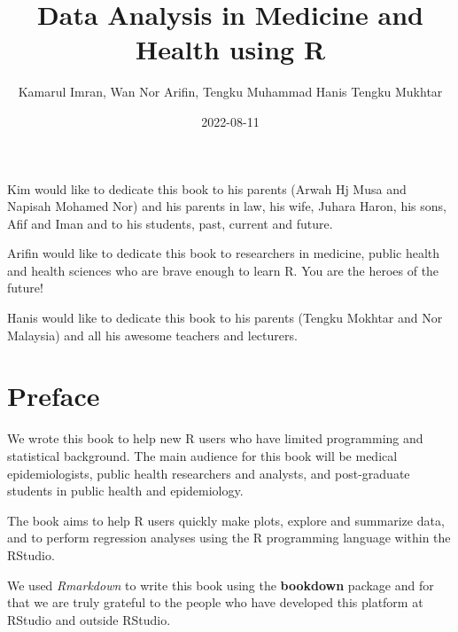 \documentclass[
  10pt,
]{krantz}
\title{Data Analysis in Medicine and Health using R}
\author{Kamarul Imran, Wan Nor Arifin, Tengku Muhammad Hanis Tengku Mukhtar}
\date{2022-08-11}
\begin{document}
\maketitle


\thispagestyle{empty}

\begin{center}

Kim would like to dedicate this book to his parents (Arwah Hj Musa and Napisah Mohamed Nor) and his parents in law, his wife, Juhara Haron, his sons, Afif and Iman and to his students, past, current and future.

Arifin would like to dedicate this book to researchers in medicine, public health and health sciences who are brave enough to learn R. You are the heroes of the future!

Hanis would like to dedicate this book to his parents (Tengku Mokhtar and Nor Malaysia) and all his awesome teachers and lecturers.

\end{center}

\setlength{\abovedisplayskip}{-5pt}
\setlength{\abovedisplayshortskip}{-5pt}

{
\hypersetup{linkcolor=}
\setcounter{tocdepth}{2}
\tableofcontents
}
\listoffigures
\listoftables
\hypertarget{preface}{%
\chapter*{Preface}\label{preface}}


We wrote this book to help new R users who have limited programming and statistical background. The main audience for this book will be medical epidemiologists, public health researchers and analysts, and post-graduate students in public health and epidemiology.

The book aims to help R users quickly make plots, explore and summarize data, and to perform regression analyses using the R programming language within the RStudio.

We used \emph{Rmarkdown} to write this book using the \textbf{bookdown} package and for that we are truly grateful to the people who have developed this platform at RStudio and outside RStudio.
\end{document}
